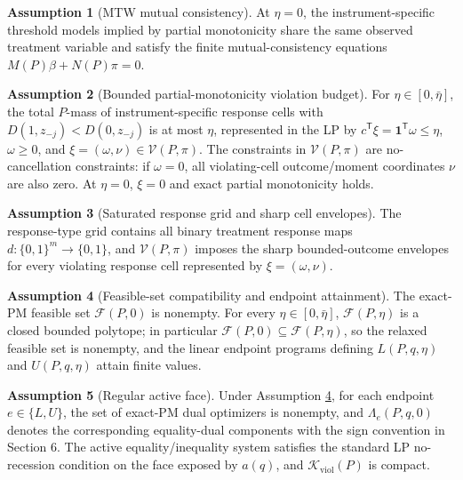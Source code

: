 \documentclass[11pt]{article}
\newcommand{\transpose}{\mathsf{T}}
\theoremstyle{definition}
\newtheorem{assumption}{Assumption}
\theoremstyle{plain}
\theoremstyle{remark}
\begin{document}
\begin{assumption}[MTW mutual consistency]\label{ass:mutual}
At \(\eta=0\), the instrument-specific threshold models implied by partial monotonicity share the same observed treatment variable and satisfy the finite mutual-consistency equations \(M(P)\beta+N(P)\pi=0\).
\end{assumption}

\begin{assumption}[Bounded partial-monotonicity violation budget]\label{ass:eta}
For \(\eta\in[0,\bar\eta]\), the total \(P\)-mass of instrument-specific response cells with \(D(1,z_{-j})<D(0,z_{-j})\) is at most \(\eta\), represented in the LP by \(c^\transpose\xi=\mathbf 1^\transpose\omega\le\eta\), \(\omega\ge0\), and \(\xi=(\omega,\nu)\in\mathcal V(P,\pi)\).  The constraints in \(\mathcal V(P,\pi)\) are no-cancellation constraints: if \(\omega=0\), all violating-cell outcome/moment coordinates \(\nu\) are also zero.  At \(\eta=0\), \(\xi=0\) and exact partial monotonicity holds.
\end{assumption}

\begin{assumption}[Saturated response grid and sharp cell envelopes]\label{ass:cellsharp}
The response-type grid contains all binary treatment response maps \(d:\{0,1\}^m\to\{0,1\}\), and \(\mathcal V(P,\pi)\) imposes the sharp bounded-outcome envelopes for every violating response cell represented by \(\xi=(\omega,\nu)\).
\end{assumption}

\begin{assumption}[Feasible-set compatibility and endpoint attainment]\label{ass:compat}
The exact-PM feasible set \(\mathcal F(P,0)\) is nonempty.  For every \(\eta\in[0,\bar\eta]\), \(\mathcal F(P,\eta)\) is a closed bounded polytope; in particular \(\mathcal F(P,0)\subseteq\mathcal F(P,\eta)\), so the relaxed feasible set is nonempty, and the linear endpoint programs defining \(L(P,q,\eta)\) and \(U(P,q,\eta)\) attain finite values.
\end{assumption}

\begin{assumption}[Regular active face]\label{ass:regular}
Under Assumption \ref{ass:compat}, for each endpoint \(e\in\{L,U\}\), the set of exact-PM dual optimizers is nonempty, and \(\Lambda_e(P,q,0)\) denotes the corresponding equality-dual components with the sign convention in Section 6.  The active equality/inequality system satisfies the standard LP no-recession condition on the face exposed by \(a(q)\), and \(\mathcal K_{\mathrm{viol}}(P)\) is compact.
\end{assumption}
\end{document}
